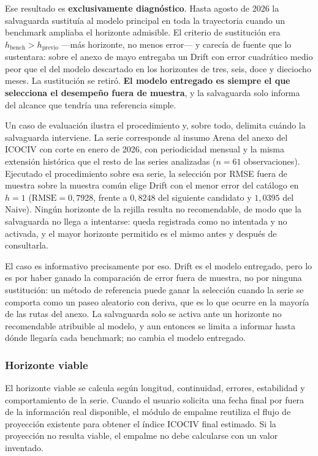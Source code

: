 \documentclass[12pt,letterpaper]{article}
\newcommand{\ICOCIV}{ICOCIV}
\begin{document}
Ese resultado es \textbf{exclusivamente diagnóstico}. Hasta agosto de 2026 la salvaguarda sustituía al modelo principal en toda la trayectoria cuando un benchmark ampliaba el horizonte admisible. El criterio de sustitución era \(h_{\text{bench}}>h_{\text{previo}}\) ---más horizonte, no menos error--- y carecía de fuente que lo sustentara: sobre el anexo de mayo entregaba un Drift con error cuadrático medio peor que el del modelo descartado en los horizontes de tres, seis, doce y dieciocho meses. La sustitución se retiró. \textbf{El modelo entregado es siempre el que selecciona el desempeño fuera de muestra}, y la salvaguarda solo informa del alcance que tendría una referencia simple.

Un caso de evaluación ilustra el procedimiento y, sobre todo, delimita cuándo la salvaguarda interviene. La serie corresponde al insumo Arena del anexo del \ICOCIV{} con corte en enero de 2026, con periodicidad mensual y la misma extensión histórica que el resto de las series analizadas ($n = 61$ observaciones). Ejecutado el procedimiento sobre esa serie, la selección por RMSE fuera de muestra sobre la muestra común elige Drift con el menor error del catálogo en $h = 1$ ($\mathrm{RMSE} = 0{,}7928$, frente a $0{,}8248$ del siguiente candidato y $1{,}0395$ del Naive). Ningún horizonte de la rejilla resulta no recomendable, de modo que la salvaguarda no llega a intentarse: queda registrada como no intentada y no activada, y el mayor horizonte permitido es el mismo antes y después de consultarla.

El caso es informativo precisamente por eso. Drift es el modelo entregado, pero lo es por haber ganado la comparación de error fuera de muestra, no por ninguna sustitución: un método de referencia puede ganar la selección cuando la serie se comporta como un paseo aleatorio con deriva, que es lo que ocurre en la mayoría de las rutas del anexo. La salvaguarda solo se activa ante un horizonte no recomendable atribuible al modelo, y aun entonces se limita a informar hasta dónde llegaría cada benchmark; no cambia el modelo entregado.

\subsubsection{Horizonte viable}

El horizonte viable se calcula según longitud, continuidad, errores, estabilidad y comportamiento de la serie. Cuando el usuario solicita una fecha final por fuera de la información real disponible, el módulo de empalme reutiliza el flujo de proyección existente para obtener el índice \ICOCIV{} final estimado. Si la proyección no resulta viable, el empalme no debe calcularse con un valor inventado.
\end{document}
